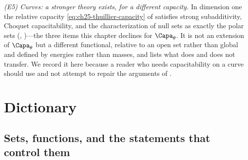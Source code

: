 \emph{(E5) Curves: a stronger theory exists, for a different capacity.}
In dimension one the relative capacity \eqref{eq:ch25-thuillier-capacity} of
\cite{Thu05} satisfies strong subadditivity, Choquet capacitability, and the
characterization of null sets as exactly the polar sets
(,
)---the three items this chapter declines for
\(\Capa_\theta\).  It is not an extension of \(\Capa_\theta\) but a different
functional, relative to an open set rather than global and defined by
energies rather than masses, and  lists what
does and does not transfer.  We record it here because a reader who needs
capacitability on a curve should use \cite{Thu05} and not attempt to repair
the arguments of .

\section{Dictionary}
\label{sec:ch25-dictionary}

\subsection{Sets, functions, and the statements that control them}
\label{sec:ch25-dict-objects}

